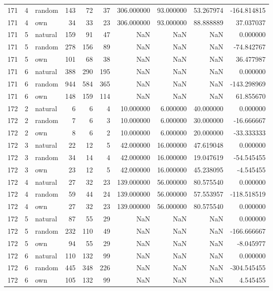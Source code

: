 \begin{table}[htbp]
\begin{tabular}{rrlrrrrrrr}
171 & 4 & random & 143 & 72 & 37 & 306.000000 & 93.000000 & 53.267974 & -164.814815 \\
171 & 4 & own & 34 & 33 & 23 & 306.000000 & 93.000000 & 88.888889 & 37.037037 \\
171 & 5 & natural & 159 & 91 & 47 & NaN & NaN & NaN & 0.000000 \\
171 & 5 & random & 278 & 156 & 89 & NaN & NaN & NaN & -74.842767 \\
171 & 5 & own & 101 & 68 & 38 & NaN & NaN & NaN & 36.477987 \\
171 & 6 & natural & 388 & 290 & 195 & NaN & NaN & NaN & 0.000000 \\
171 & 6 & random & 944 & 584 & 365 & NaN & NaN & NaN & -143.298969 \\
171 & 6 & own & 148 & 159 & 114 & NaN & NaN & NaN & 61.855670 \\
172 & 2 & natural & 6 & 6 & 4 & 10.000000 & 6.000000 & 40.000000 & 0.000000 \\
172 & 2 & random & 7 & 6 & 3 & 10.000000 & 6.000000 & 30.000000 & -16.666667 \\
172 & 2 & own & 8 & 6 & 2 & 10.000000 & 6.000000 & 20.000000 & -33.333333 \\
172 & 3 & natural & 22 & 12 & 5 & 42.000000 & 16.000000 & 47.619048 & 0.000000 \\
172 & 3 & random & 34 & 14 & 4 & 42.000000 & 16.000000 & 19.047619 & -54.545455 \\
172 & 3 & own & 23 & 12 & 5 & 42.000000 & 16.000000 & 45.238095 & -4.545455 \\
172 & 4 & natural & 27 & 32 & 23 & 139.000000 & 56.000000 & 80.575540 & 0.000000 \\
172 & 4 & random & 59 & 44 & 24 & 139.000000 & 56.000000 & 57.553957 & -118.518519 \\
172 & 4 & own & 27 & 32 & 23 & 139.000000 & 56.000000 & 80.575540 & 0.000000 \\
172 & 5 & natural & 87 & 55 & 29 & NaN & NaN & NaN & 0.000000 \\
172 & 5 & random & 232 & 110 & 49 & NaN & NaN & NaN & -166.666667 \\
172 & 5 & own & 94 & 55 & 29 & NaN & NaN & NaN & -8.045977 \\
172 & 6 & natural & 110 & 132 & 99 & NaN & NaN & NaN & 0.000000 \\
172 & 6 & random & 445 & 348 & 226 & NaN & NaN & NaN & -304.545455 \\
172 & 6 & own & 105 & 132 & 99 & NaN & NaN & NaN & 4.545455 \\

\end{tabular}
\end{table}
